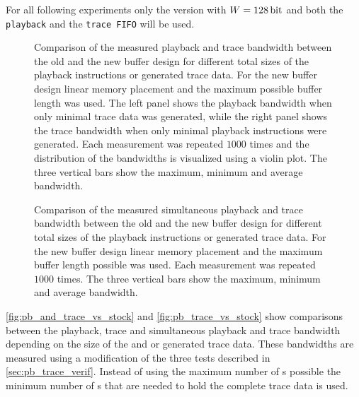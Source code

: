 For all following experiments only the version with $W = \SI{128}{\bit}$ and both the \texttt{playback} and the \texttt{trace FIFO} will be used.


\begin{figure}[htbp]
\caption{Comparison of the measured playback and trace bandwidth between the old and the new buffer design for different total sizes of the playback instructions or generated trace data. For the new buffer design linear memory placement and the maximum possible buffer length was used. The left panel shows the playback bandwidth when only minimal trace data was generated, while the right panel shows the trace bandwidth when only minimal playback instructions were generated. Each measurement was repeated $\num{1000}$ times and the distribution of the bandwidths is visualized using a violin plot. The three vertical bars show the maximum, minimum and average bandwidth.}\label{fig:pb_and_trace_vs_stock}
\end{figure}

\begin{figure}[htbp]
\caption{Comparison of the measured simultaneous playback and trace bandwidth between the old and the new buffer design for different total sizes of the playback instructions or generated trace data. For the new buffer design linear memory placement and the maximum buffer length possible was used. Each measurement was repeated $\num{1000}$ times. The three vertical bars show the maximum, minimum and average bandwidth.}\label{fig:pb_trace_vs_stock}
\end{figure}

\autoref{fig:pb_and_trace_vs_stock} and \autoref{fig:pb_trace_vs_stock} show comparisons between the playback, trace and simultaneous playback and trace bandwidth depending on the size of the \PlaybackProgram{} and or generated trace data. These bandwidths are measured using a modification of the three tests described in \autoref{sec:pb_trace_verif}. Instead of using the maximum number of \descriptor{}s possible the minimum number of \descriptor{}s that are needed to hold the complete \PlaybackProgram{} trace data is used.

